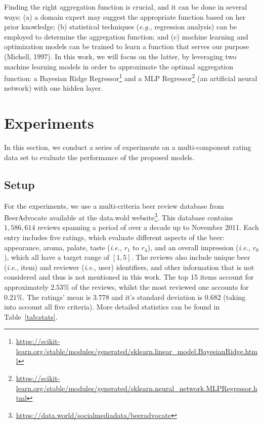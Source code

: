\documentclass[sigconf,authordraft]{acmart}
\begin{document}
Finding the right aggregation function is crucial, and it can be done in several ways: (a) a domain expert may suggest the appropriate function based on her prior knowledge; (b) statistical techniques (\textit{e.g.}, regression analysis) can be employed to determine the aggregation function; and (c) machine learning and optimization models can be trained to learn a function that serves our purpose (Michell, 1997). In this work, we will focus on the latter, by leveraging two machine learning models in order to approximate the optimal aggregation function: a Bayesian Ridge Regressor\footnote{\url{https://scikit-learn.org/stable/modules/generated/sklearn.linear_model.BayesianRidge.html}} and a MLP Regressor\footnote{\url{https://scikit-learn.org/stable/modules/generated/sklearn.neural_network.MLPRegressor.html}} (an artificial neural network) with one hidden layer.

\section{Experiments}

In this section, we conduct a series of experiments on a multi-component rating data set to evaluate the performance of the proposed models.

\subsection{Setup}
\label{sec:setup}

For the experiments, we use a multi-criteria beer review database from BeerAdvocate available at the data.wold website\footnote{\label{foot:beeradvocate}\url{https://data.world/socialmediadata/beeradvocate}}. This database contains $1,586,614$ reviews spanning a period of over a decade up to November 2011. Each entry includes five ratings, which evaluate different aspects of the beer: appearance, aroma, palate, taste (\textit{i.e.}, $r_1$ to $r_4$), and an overall impression (\textit{i.e.}, $r_0$), which all have a target range of $[1, 5]$. The reviews also include unique beer (\textit{i.e.}, item) and reviewer (\textit{i.e.}, user) identifiers, and other information that is not considered and thus is not mentioned in this work. The top 15 items account for approximately $2.53\%$ of the reviews, whilst the most reviewed one accounts for $0.21\%$. The ratings' mean is $3.778$ and it's standard deviation is $0.682$ (taking into account all five criteria).  More detailed statistics can be found in Table~\ref{tab:stats}.
\end{document}
